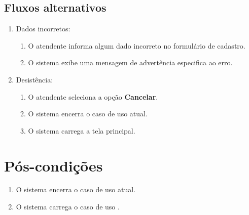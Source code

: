 \subsection{Fluxos alternativos}

\begin{enumerate}
	\item Dados incorretos:
	\begin{enumerate}
		\item O atendente informa algum dado incorreto no formulário de cadastro. 
		\item O sistema exibe uma mensagem de advertência especifica ao erro.
	\end{enumerate}	
	\item Desistência:
	\begin{enumerate}
		\item O atendente seleciona a opção \textbf{Cancelar}.
		\item O sistema encerra o caso de uso atual.
		\item O sistema carrega a tela principal.
	\end{enumerate}
\end{enumerate}



\section{Pós-condições}

\begin{enumerate}
	\item O sistema encerra o caso de uso atual.
	\item O sistema carrega o caso de uso .
\end{enumerate}


